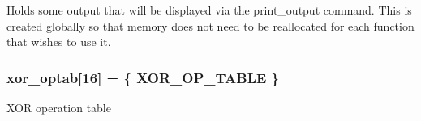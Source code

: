 Holds some output that will be displayed via the print\_\-output command. This is created globally so that memory does not need to be reallocated for each function that wishes to use it. 
\subsubsection{ {\bf xor\_\-optab}[16] = \{ XOR\_\-OP\_\-TABLE \}}\label{vector_8c_a0}


XOR operation table 